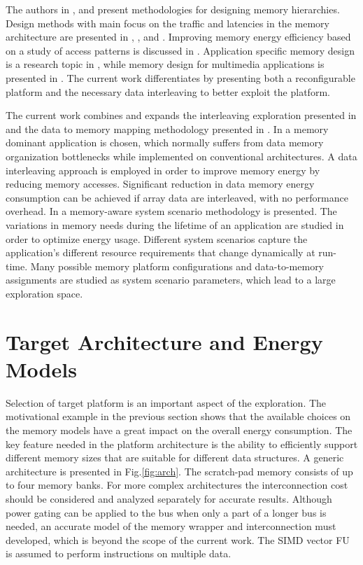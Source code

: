 \documentclass[prodmode,acmtecs]{acmsmall}
\begin{document}
The authors in \cite{abraham1999automatic}, \cite{jacob1996analytical} and \cite{li1999hardware} present methodologies for designing memory hierarchies.
Design methods with main focus on the traffic and latencies in the memory architecture are presented in \cite{chen1999loop}, \cite{grun2000mist}, \cite{jantsch1994hardware} and \cite{passes1995multi}.
Improving memory energy efficiency based on a study of access patterns is discussed in \cite{kandemir2001improving}.
Application specific memory design is a research topic in \cite{schmit1997synthesis}, while memory design for multimedia applications is presented in \cite{oshima1997high}.
The current work differentiates by presenting both a reconfigurable platform and the necessary data interleaving to better exploit the platform.

The current work combines and expands the interleaving exploration presented in \cite{sharma2013data} and the data to memory mapping methodology presented in \cite{filippopoulos2013exploration}. 
In \cite{sharma2013data} a memory dominant application is chosen, which normally suffers from data memory organization bottlenecks while implemented on conventional architectures. 
A data interleaving approach is employed in order to improve memory energy by reducing memory accesses.
Significant reduction in data memory energy consumption can be achieved if array data are interleaved, with no performance overhead.
In \cite{filippopoulos2013exploration} a memory-aware system scenario methodology is presented.
The variations in memory needs during the lifetime of an application are studied in order to optimize energy usage.
Different system scenarios capture the application's different resource requirements that change dynamically at run-time.
Many possible memory platform configurations and data-to-memory assignments are studied as system scenario parameters, which lead to a large exploration space.

\section{Target Architecture and Energy Models}
\label{sec:platform}

Selection of target platform is an important aspect of the exploration.
The motivational example in the previous section shows that the available choices on the memory models have a great impact on the overall energy consumption.
 The key feature needed in the platform architecture is the ability to efficiently support different memory sizes that are suitable for different data structures.
A generic architecture is presented in Fig.\ref{fig:arch}.
The scratch-pad memory consists of up to four memory banks. 
For more complex architectures the interconnection cost should be considered and analyzed separately for accurate results. 
Although power gating can be applied to the bus when only a part of a longer bus is needed, an accurate model of the memory wrapper and interconnection must developed, which is beyond the scope of the current work.
The SIMD vector FU is assumed to perform instructions on multiple data.
\end{document}
